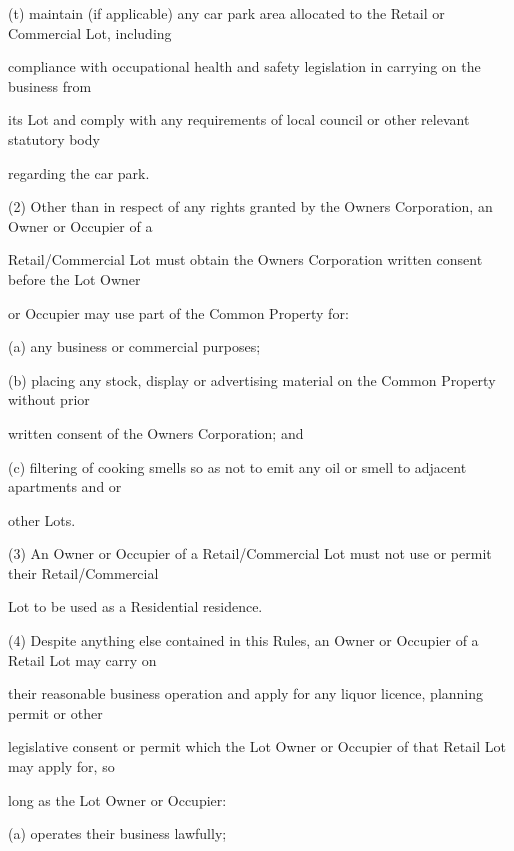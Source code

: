 \documentclass{article}
\begin{document}
{\fontsize{9.962}{1}(t) maintain (if applicable) any car park area allocated to the Retail or Commercial Lot, including }

{\fontsize{10.02}{1}compliance with occupational health and safety legislation in carrying on the business from }

{\fontsize{10.02}{1}its Lot and comply with any requirements of local council or other relevant statutory body }

{\fontsize{10.02}{1}regarding the car park. }

{\fontsize{9.962}{1}(2) Other than in respect of any rights granted by the Owners Corporation, an Owner or Occupier of a }

{\fontsize{10.02}{1}Retail/Commercial Lot must obtain the Owners Corporation written consent before the Lot Owner }

{\fontsize{10.02}{1}or Occupier may use part of the Common Property for: }

\newpage

{\fontsize{9.962}{1}(a) any business or commercial purposes; }

{\fontsize{9.962}{1}(b) placing any stock, display or advertising material on the Common Property without prior }

{\fontsize{10.02}{1}written consent of the Owners Corporation; and }

{\fontsize{9.962}{1}(c) filtering of cooking smells so as not to emit any oil or smell to adjacent apartments and or }

{\fontsize{10.02}{1}other Lots. }

{\fontsize{9.962}{1}(3) An Owner or Occupier of a Retail/Commercial Lot must not use or permit their Retail/Commercial }

{\fontsize{10.02}{1}Lot to be used as a Residential residence. }

{\fontsize{9.962}{1}(4) Despite anything else contained in this Rules, an Owner or Occupier of a Retail Lot may carry on }

{\fontsize{10.02}{1}their reasonable business operation and apply for any liquor licence, planning permit or other }

{\fontsize{10.02}{1}legislative consent or permit which the Lot Owner or Occupier of that Retail Lot may apply for, so }

{\fontsize{10.02}{1}long as the Lot Owner or Occupier: }

{\fontsize{9.962}{1}(a) operates their business lawfully; }
\end{document}
